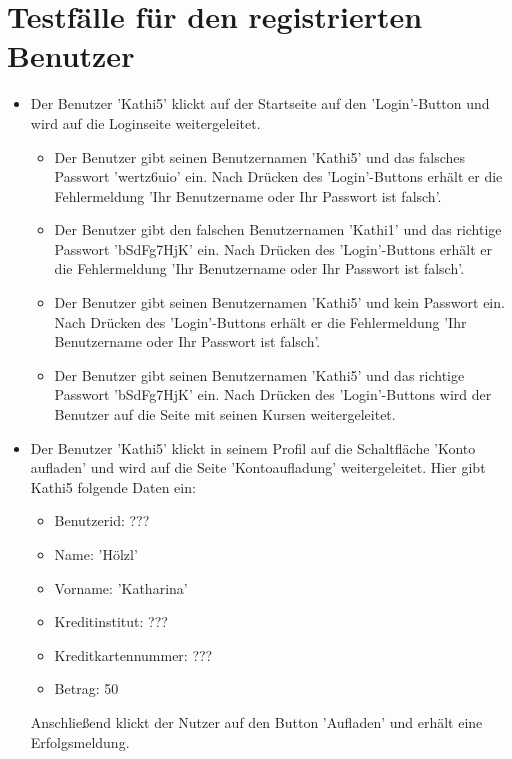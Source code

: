 \documentclass[a4paper]{scrreprt}
\newcounter{Lc}
\newcounter{Hc}
\newcommand{\stepHc}{\stepcounter{Hc}\setcounter{Lc}{0}}
\begin{document}
	\section{Testfälle für den registrierten Benutzer}
		\stepHc
		\begin{itemize}
			\item {} 
			Der Benutzer 'Kathi5' klickt auf der Startseite	auf den 'Login'-Button und wird auf die Loginseite weitergeleitet.
			\begin{itemize}
				\item Der Benutzer gibt seinen Benutzernamen 'Kathi5' und das falsches Passwort 'wertz6uio' ein. Nach Drücken des 'Login'-Buttons erhält er die Fehlermeldung 'Ihr Benutzername oder Ihr Passwort ist falsch'.
				\item Der Benutzer gibt den falschen Benutzernamen 'Kathi1' und das richtige Passwort 'bSdFg7HjK' ein. Nach Drücken des 'Login'-Buttons erhält er die Fehlermeldung 'Ihr Benutzername oder Ihr Passwort ist falsch'.
				\item Der Benutzer gibt seinen Benutzernamen 'Kathi5' und kein Passwort ein. Nach Drücken des 'Login'-Buttons erhält er die Fehlermeldung 'Ihr Benutzername oder Ihr Passwort ist falsch'.
				\item Der Benutzer gibt seinen Benutzernamen 'Kathi5' und das richtige Passwort 'bSdFg7HjK' ein. Nach Drücken des 'Login'-Buttons wird der Benutzer auf die Seite mit seinen Kursen weitergeleitet.
			\end{itemize}
			\item {} 
			Der Benutzer 'Kathi5' klickt in seinem Profil auf die Schaltfläche 'Konto aufladen' und wird auf die Seite 'Kontoaufladung' weitergeleitet. Hier gibt Kathi5 folgende Daten ein:
				 \begin{itemize}
				 	\item Benutzerid: ???
				 	\item Name: 'Hölzl'
				 	\item Vorname: 'Katharina'
				 	\item Kreditinstitut: ???
				 	\item Kreditkartennummer: ???
				 	\item Betrag: 50 
				 \end{itemize}	
			Anschließend klickt der Nutzer auf den Button 'Aufladen' und erhält eine Erfolgsmeldung.
			\end{itemize}
			
\end{document}
